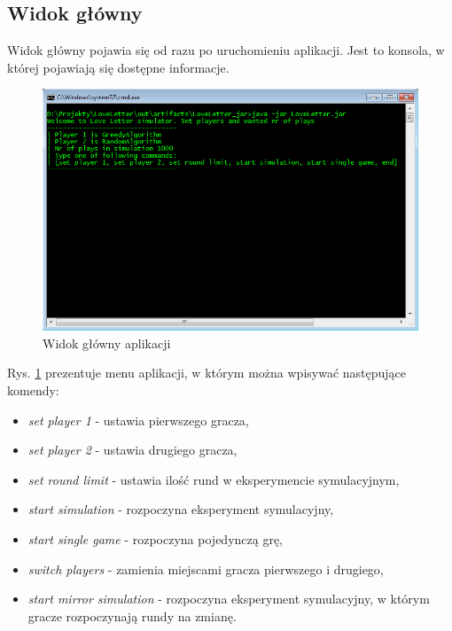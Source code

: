 \subsection*{Widok główny}
Widok główny pojawia się od razu po uruchomieniu aplikacji. Jest to konsola, w której pojawiają się dostępne informacje.
\begin{figure}[H]
	\centering
	\includegraphics[width=\textwidth]{Resources/cli.PNG}
	\caption{Widok główny aplikacji} 
	\label{fig:cli}
\end{figure}
Rys. \ref{fig:cli} prezentuje menu aplikacji, w którym można wpisywać następujące komendy:
\begin{itemize}
	\item \textit{set player 1} - ustawia pierwszego gracza,
	\item \textit{set player 2} - ustawia drugiego gracza,
	\item \textit{set round limit} - ustawia ilość rund w eksperymencie symulacyjnym,
	\item \textit{start simulation} - rozpoczyna eksperyment symulacyjny,
	\item \textit{start single game} - rozpoczyna pojedynczą grę,
	\item \textit{switch players} - zamienia miejscami gracza pierwszego i drugiego,
	\item \textit{start mirror simulation} - rozpoczyna eksperyment symulacyjny, w którym gracze rozpoczynają rundy na zmianę.
\end{itemize}

